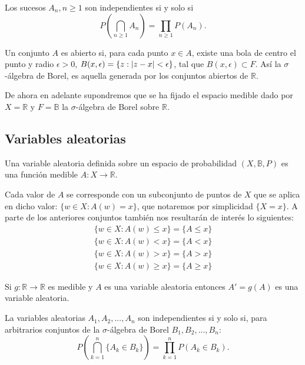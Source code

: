 \documentclass[../proyecto.tex]{memoir}
\begin{document}
\begin{defi}
Los sucesos ${A_n, n \geq 1}$ son independientes si y solo si $$
P \left( \bigcap_{n \geq 1} A_{n} \right) = \prod_{n \geq 1} P(A_n).
$$
\end{defi}

\begin{defi}
Un conjunto $A$ es abierto si, para cada punto $x\in A$, existe una bola de centro el punto y radio $\epsilon > 0$, $B(x,\epsilon)=\{ z : \abs{z-x} < \epsilon\}$, tal que $B(x,\epsilon) \subset F$. Así la $\sigma$-álgebra de Borel, es aquella generada por los conjuntos abiertos de $\mathds{R}$.
\end{defi}

De ahora en adelante supondremos que se ha fijado el espacio medible dado por $X=\mathds{R}$ y $F=\mathds{B}$ la $\sigma$-álgebra de Borel sobre $\mathds{R}$.

\subsection{Variables aleatorias}

\begin{defi}
Una variable aleatoria definida sobre un espacio de probabilidad $(X, \mathds{B}, P)$ es una función medible $A: X \to \mathds{R}$.
\end{defi}

Cada valor de $A$ se corresponde con un subconjunto de puntos de $X$ que se aplica en dicho valor: $\{ w\in X : A(w)=x\}$, que notaremos por simplicidad $\{X = x\}$. A parte de los anteriores conjuntos también nos resultarán de interés lo siguientes:
\begin{align*}
\{ w\in X : A(w) \leq x\} = \{ A \leq x \} \\
\{ w\in X : A(w) < x\} = \{ A < x \} \\
\{ w\in X : A(w) > x\} = \{ A > x \} \\
\{ w\in X : A(w) \geq x\} = \{ A \geq x \}
\end{align*}

\begin{prop} \label{funcion_de_va}
Si $g:\mathds{R}\to\mathds{R}$ es medible y $A$ es una variable aleatoria entonces $A'=g(A)$ es una variable aleatoria.
\end{prop}

\begin{defi}
La variables aleatorias $A_1, A_2,..., A_n$ son independientes si y solo si, para arbitrarios conjuntos de la $\sigma$-álgebra de Borel $B_1, B_2,..., B_n$: $$
	P \left( \bigcap_{k = 1}^{n} \{A_k \in B_k\} \right) = \prod_{k = 1}^{n} P(A_k \in B_k).
$$
\end{defi}
\end{document}
